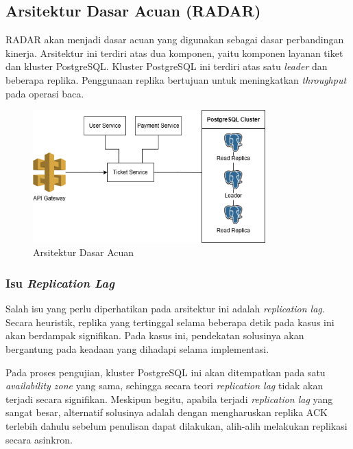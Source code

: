 \subsection{Arsitektur Dasar Acuan (RADAR)}

RADAR akan menjadi dasar acuan yang digunakan sebagai dasar perbandingan kinerja. Arsitektur ini terdiri atas dua komponen, yaitu komponen layanan tiket dan kluster PostgreSQL. Kluster PostgreSQL ini terdiri atas satu \textit{leader} dan beberapa replika. Penggunaan replika bertujuan untuk meningkatkan \textit{throughput} pada operasi baca.

\begin{figure}[htbp]
    \centering
    \includegraphics[width=0.8\textwidth]{resources/appendix/architecture-reference.png}
    \caption{Arsitektur Dasar Acuan}
    \label{fig:baseline-architecture}
\end{figure}

\subsubsection{Isu \textit{Replication Lag}}

Salah isu yang perlu diperhatikan pada arsitektur ini adalah \textit{replication lag}. Secara heuristik, replika yang tertinggal selama beberapa detik pada kasus ini akan berdampak signifikan. Pada kasus ini, pendekatan solusinya akan bergantung pada keadaan yang dihadapi selama implementasi.

Pada proses pengujian, kluster PostgreSQL ini akan ditempatkan pada satu \textit{availability zone} yang sama, sehingga secara teori \textit{replication lag} tidak akan terjadi secara signifikan. Meskipun begitu, apabila terjadi \textit{replication lag} yang sangat besar, alternatif solusinya adalah dengan mengharuskan replika ACK terlebih dahulu sebelum penulisan dapat dilakukan, alih-alih melakukan replikasi secara asinkron.

